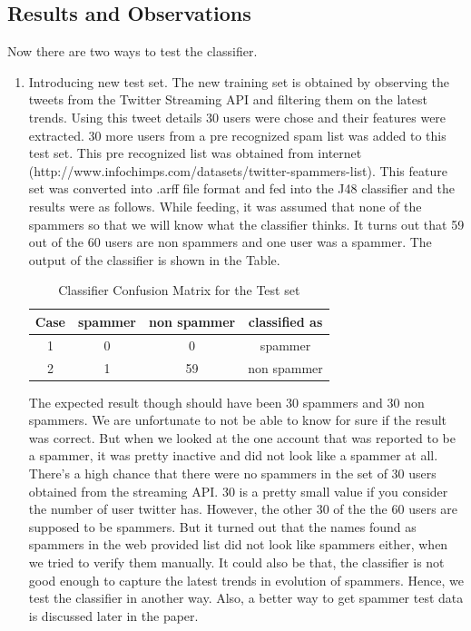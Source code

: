 \documentclass[11pt]{article}
\begin{document}
\subsection {Results and Observations}
Now there are two ways to test the classifier.
\begin{enumerate}
\item Introducing new test set. The new training set is obtained by observing the tweets from the Twitter Streaming API and filtering them on the latest trends. Using this tweet details 30 users were chose and their features were extracted. 30 more users from a pre recognized spam list was added to this test set. This pre recognized list was obtained from internet (http://www.infochimps.com/datasets/twitter-spammers-list). This feature set was converted into .arff file format and fed into the J48 classifier and the results were as follows. While feeding, it was assumed that none of the spammers so that we will know what the classifier thinks. It turns out that 59 out of the 60 users are non spammers and one user was a spammer. The output of the classifier is shown in the Table.

\begin{table}[ht] 
\caption{Classifier Confusion Matrix for the Test set} %
\centering %
\begin{tabular}{c c c c} %
\hline\hline %
Case & spammer & non spammer & classified as \\ [0.5ex] %
\hline %
1 & 0 & 0 & spammer \\ %
2 & 1 & 59 & non spammer \\ [1ex] %
\hline %
\end{tabular} 
\label{table:nonlin} %
\end{table}

The expected result though should have been 30 spammers and 30 non spammers. We are unfortunate to not be able to know for sure if the result was correct. But when we looked at the one account that was reported to be a spammer, it was pretty inactive and did not look like a spammer at all. There's a high chance that there were no spammers in the set of 30 users obtained from the streaming API. 30 is a pretty small value if you consider the number of user twitter has. However, the other 30 of the the 60 users are supposed to be spammers. But it turned out that the names found as spammers in the web provided list did not look like spammers either, when we tried to verify them manually. It could also be that, the classifier is not good enough to capture the latest trends in evolution of spammers. Hence, we test the classifier in another way. Also, a better way to get spammer test data is discussed later in the paper.


\end{enumerate}
\end{document}
